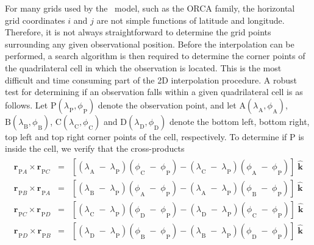 \documentclass[../main/NEMO_manual]{subfiles}
\begin{document}
For many grids used by the \NEMO\ model, such as the ORCA family, the horizontal grid coordinates $i$ and $j$ are not simple functions of latitude and longitude.
Therefore, it is not always straightforward to determine the grid points surrounding any given observational position.
Before the interpolation can be performed, a search algorithm is then required to determine the corner points of
the quadrilateral cell in which the observation is located.
This is the most difficult and time consuming part of the 2D interpolation procedure.
A robust test for determining if an observation falls within a given quadrilateral cell is as follows.
Let ${\mathrm P}({\lambda_{}}_{\mathrm P} ,{\phi_{}}_{\mathrm P} )$ denote the observation point,
and let ${\mathrm A}({\lambda_{}}_{\mathrm A} ,{\phi_{}}_{\mathrm A} )$, ${\mathrm B}({\lambda_{}}_{\mathrm B} ,{\phi_{}}_{\mathrm B} )$,
${\mathrm C}({\lambda_{}}_{\mathrm C} ,{\phi_{}}_{\mathrm C} )$ and ${\mathrm D}({\lambda_{}}_{\mathrm D} ,{\phi_{}}_{\mathrm D} )$
denote the bottom left, bottom right, top left and top right corner points of the cell, respectively.
To determine if P is inside the cell, we verify that the cross-products
\begin{align*}
  \begin{array}{lllll}
    {{\mathbf r}_{}}_{\mathrm PA} \times {{\mathbf r}_{}}_{\mathrm PC}
    & = & [({\lambda_{}}_{\mathrm A}\; -\; {\lambda_{}}_{\mathrm P} )
          ({\phi_{}}_{\mathrm C}   \; -\; {\phi_{}}_{\mathrm P} )
          - ({\lambda_{}}_{\mathrm C}\; -\; {\lambda_{}}_{\mathrm P} )
          ({\phi_{}}_{\mathrm A}   \; -\; {\phi_{}}_{\mathrm P} )] \; \widehat{\mathbf k} \\
    {{\mathbf r}_{}}_{\mathrm PB} \times {{\mathbf r}_{}}_{\mathrm PA}
    & = & [({\lambda_{}}_{\mathrm B}\; -\; {\lambda_{}}_{\mathrm P} )
          ({\phi_{}}_{\mathrm A}   \; -\; {\phi_{}}_{\mathrm P} )
          - ({\lambda_{}}_{\mathrm A}\; -\; {\lambda_{}}_{\mathrm P} )
          ({\phi_{}}_{\mathrm B}   \; -\; {\phi_{}}_{\mathrm P} )] \; \widehat{\mathbf k} \\
    {{\mathbf r}_{}}_{\mathrm PC} \times {{\mathbf r}_{}}_{\mathrm PD}
    & = & [({\lambda_{}}_{\mathrm C}\; -\; {\lambda_{}}_{\mathrm P} )
          ({\phi_{}}_{\mathrm D}   \; -\; {\phi_{}}_{\mathrm P} )
          - ({\lambda_{}}_{\mathrm D}\; -\; {\lambda_{}}_{\mathrm P} )
          ({\phi_{}}_{\mathrm C}   \; -\; {\phi_{}}_{\mathrm P} )] \; \widehat{\mathbf k} \\
    {{\mathbf r}_{}}_{\mathrm PD} \times {{\mathbf r}_{}}_{\mathrm PB}
    & = & [({\lambda_{}}_{\mathrm D}\; -\; {\lambda_{}}_{\mathrm P} )
          ({\phi_{}}_{\mathrm B}   \; -\; {\phi_{}}_{\mathrm P} )
          - ({\lambda_{}}_{\mathrm B}\; -\; {\lambda_{}}_{\mathrm P} )
          ({\phi_{}}_{\mathrm D}  \;  - \; {\phi_{}}_{\mathrm P} )] \; \widehat{\mathbf k} \\
  \end{array}
\end{align*}
\end{document}
